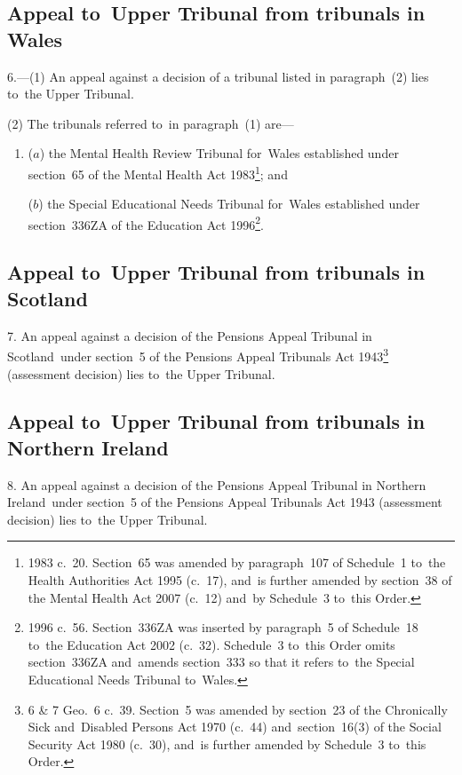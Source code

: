 \documentclass[12pt,a4paper]{article}
\begin{document}
\subsection[6. Appeal to~Upper Tribunal from tribunals in Wales]{Appeal to~Upper Tribunal from tribunals in Wales}

6.---(1)  An appeal against a decision of a tribunal listed in paragraph~(2) lies to~the Upper Tribunal.

(2) The tribunals referred to~in paragraph~(1) are—
\begin{enumerate}\item[]
($a$) the Mental Health Review Tribunal for~Wales established under section~65 of the Mental Health Act 1983\footnote{1983 c.~20. Section~65 was amended by paragraph~107 of Schedule~1 to~the Health Authorities Act 1995 (c.~17), and~is further amended by section~38 of the Mental Health Act 2007 (c.~12) and~by Schedule~3 to~this Order.}; and

($b$) the Special Educational Needs Tribunal for~Wales established under section~336ZA of the Education Act 1996\footnote{1996 c.~56. Section~336ZA was inserted by paragraph~5 of Schedule~18 to~the Education Act 2002 (c.~32). Schedule~3 to~this Order omits section~336ZA and~amends section~333 so that it refers to~the Special Educational Needs Tribunal to~Wales.}.
\end{enumerate}

\subsection[7. Appeal to~Upper Tribunal from tribunals in Scotland]{Appeal to~Upper Tribunal from tribunals in Scotland}

7.  An appeal against a decision of the Pensions Appeal Tribunal in Scotland~under section~5 of the Pensions Appeal Tribunals Act 1943\footnote{6 \& 7 Geo.~6 c.~39. Section~5 was amended by section~23 of the Chronically Sick and~Disabled Persons Act 1970 (c.~44) and~section~16(3) of the Social Security Act 1980 (c.~30), and~is further amended by Schedule~3 to~this Order.} (assessment decision) lies to~the Upper Tribunal.

\subsection[8. Appeal to~Upper Tribunal from tribunals in Northern Ireland]{Appeal to~Upper Tribunal from tribunals in Northern Ireland}

8.  An appeal against a decision of the Pensions Appeal Tribunal in Northern Ireland~under section~5 of the Pensions Appeal Tribunals Act 1943 (assessment decision) lies to~the Upper Tribunal.
\end{document}
